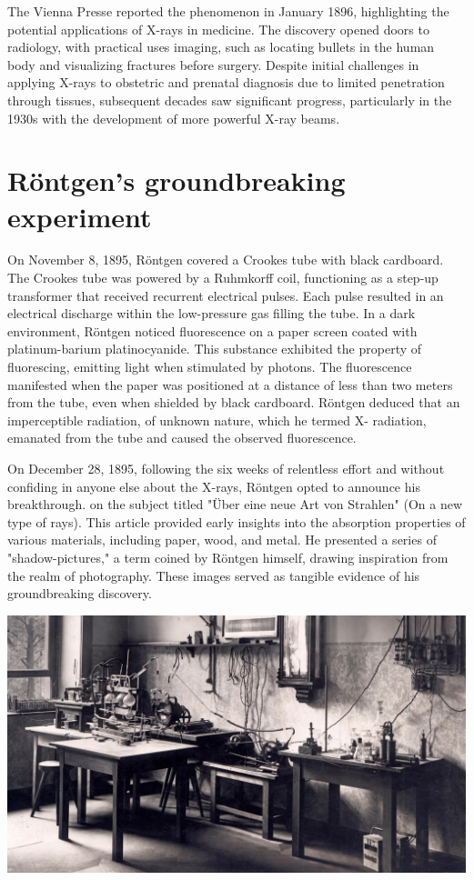 \documentclass[a4paper,12pt]{report}
\begin{document}
The Vienna Presse reported the phenomenon in January 1896, highlighting the potential
applications of X-rays in medicine. The discovery opened doors to radiology, with practical uses
imaging, such as locating bullets in the human body and visualizing fractures before surgery.
Despite initial challenges in applying X-rays to obstetric  and prenatal diagnosis due to limited
penetration through tissues, subsequent decades saw significant progress, particularly in the
1930s with the development of more powerful X-ray beams.

\section{Röntgen's groundbreaking experiment}

On November 8, 1895, Röntgen covered a Crookes tube with black cardboard. The Crookes tube
was powered by a Ruhmkorff coil, functioning as a step-up transformer that received recurrent
electrical pulses. Each pulse resulted in an electrical discharge within the low-pressure gas filling
the tube. In a dark environment, Röntgen noticed fluorescence on a paper screen coated with
platinum-barium platinocyanide. This substance exhibited the property of fluorescing, emitting
light when stimulated by photons. The fluorescence manifested when the paper was positioned at
a distance of less than two meters from the tube, even when shielded by black cardboard.
Röntgen deduced that an imperceptible radiation, of unknown nature, which he termed X-
radiation, emanated from the tube and caused the observed fluorescence.


On December 28, 1895, following the six weeks of relentless effort and without confiding in
anyone else about the X-rays, Röntgen opted to announce his breakthrough. on the subject titled
"Über eine neue Art von Strahlen" (On a new type of rays). This article provided early insights
into the absorption properties of various materials, including paper, wood, and metal. He
presented a series of "shadow-pictures," a term coined by Röntgen himself, drawing inspiration
from the realm of photography. These images served as tangible evidence of his groundbreaking
discovery.

\begin{center}
  \includegraphics[scale = 0.2 ]{lab.jpg}
  \label{lab}
\end{center}
\end{document}
